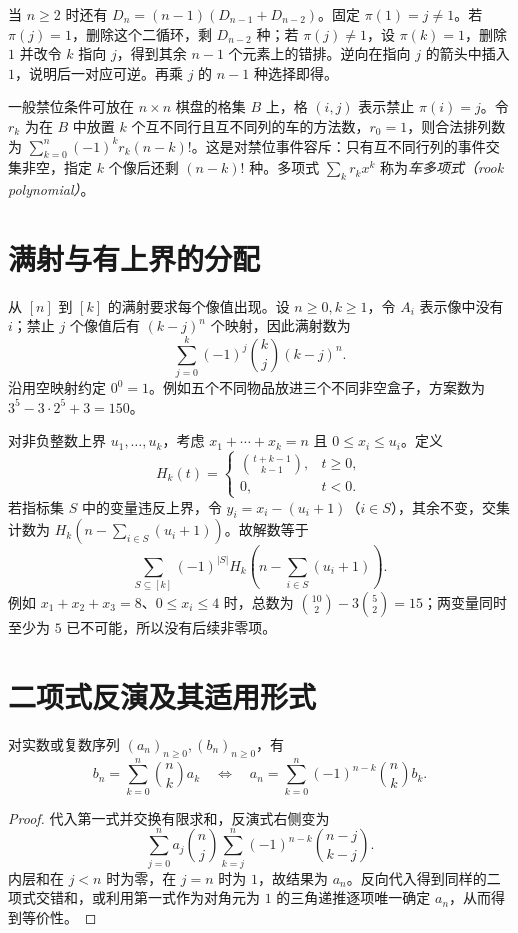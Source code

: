 当 $n\ge2$ 时还有 $D_n=(n-1)(D_{n-1}+D_{n-2})$。固定 $\pi(1)=j\ne1$。若 $\pi(j)=1$，删除这个二循环，剩 $D_{n-2}$ 种；若 $\pi(j)\ne1$，设 $\pi(k)=1$，删除 $1$ 并改令 $k$ 指向 $j$，得到其余 $n-1$ 个元素上的错排。逆向在指向 $j$ 的箭头中插入 $1$，说明后一对应可逆。再乘 $j$ 的 $n-1$ 种选择即得。

一般禁位条件可放在 $n\times n$ 棋盘的格集 $B$ 上，格 $(i,j)$ 表示禁止 $\pi(i)=j$。令 $r_k$ 为在 $B$ 中放置 $k$ 个互不同行且互不同列的车的方法数，$r_0=1$，则合法排列数为 $\sum_{k=0}^n(-1)^k r_k(n-k)!$。这是对禁位事件容斥：只有互不同行列的事件交集非空，指定 $k$ 个像后还剩 $(n-k)!$ 种。多项式 $\sum_k r_kx^k$ 称为\emph{车多项式（rook polynomial）}。

\section{满射与有上界的分配}

从 $[n]$ 到 $[k]$ 的满射要求每个像值出现。设 $n\ge0,k\ge1$，令 $A_i$ 表示像中没有 $i$；禁止 $j$ 个像值后有 $(k-j)^n$ 个映射，因此满射数为
\[
  \sum_{j=0}^k(-1)^j\binom kj(k-j)^n.
\]
沿用空映射约定 $0^0=1$。例如五个不同物品放进三个不同非空盒子，方案数为 $3^5-3\cdot2^5+3=150$。

对非负整数上界 $u_1,\ldots,u_k$，考虑 $x_1+\cdots+x_k=n$ 且 $0\le x_i\le u_i$。定义
\[
  H_k(t)=\begin{cases}\binom{t+k-1}{k-1},&t\ge0,\\0,&t<0.\end{cases}
\]
若指标集 $S$ 中的变量违反上界，令 $y_i=x_i-(u_i+1)$（$i\in S$），其余不变，交集计数为 $H_k(n-\sum_{i\in S}(u_i+1))$。故解数等于
\begin{equation}
  \sum_{S\subseteq[k]}(-1)^{|S|}
  H_k\left(n-\sum_{i\in S}(u_i+1)\right).
  \label{eq:bounded-compositions}
\end{equation}
例如 $x_1+x_2+x_3=8$、$0\le x_i\le4$ 时，总数为 $\binom{10}{2}-3\binom52=15$；两变量同时至少为 $5$ 已不可能，所以没有后续非零项。

\section{二项式反演及其适用形式}

\begin{theorem}
对实数或复数序列 $(a_n)_{n\ge0},(b_n)_{n\ge0}$，有
\begin{equation}
  b_n=\sum_{k=0}^n\binom nk a_k
  \quad\Longleftrightarrow\quad
  a_n=\sum_{k=0}^n(-1)^{n-k}\binom nk b_k.
  \label{eq:binomial-inversion}
\end{equation}
\end{theorem}
\begin{proof}
代入第一式并交换有限求和，反演式右侧变为
\[
 \sum_{j=0}^n a_j\binom nj
 \sum_{k=j}^n(-1)^{n-k}\binom{n-j}{k-j}.
\]
内层和在 $j<n$ 时为零，在 $j=n$ 时为 $1$，故结果为 $a_n$。反向代入得到同样的二项式交错和，或利用第一式作为对角元为 $1$ 的三角递推逐项唯一确定 $a_n$，从而得到等价性。
\end{proof}

